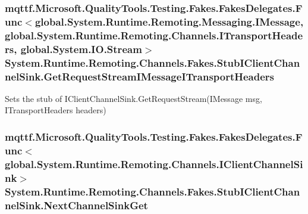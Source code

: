 \hypertarget{class_system_1_1_runtime_1_1_remoting_1_1_channels_1_1_fakes_1_1_stub_i_client_channel_sink_a3360fc1881ec5d814a861955162276dd}{
\subsubsection[{Get\-Request\-Stream\-I\-Message\-I\-Transport\-Headers}]{\setlength{\rightskip}{0pt plus 5cm}mqttf.\-Microsoft.\-Quality\-Tools.\-Testing.\-Fakes.\-Fakes\-Delegates.\-Func$<$global.\-System.\-Runtime.\-Remoting.\-Messaging.\-I\-Message, global.\-System.\-Runtime.\-Remoting.\-Channels.\-I\-Transport\-Headers, global.\-System.\-I\-O.\-Stream$>$ System.\-Runtime.\-Remoting.\-Channels.\-Fakes.\-Stub\-I\-Client\-Channel\-Sink.\-Get\-Request\-Stream\-I\-Message\-I\-Transport\-Headers}}\label{class_system_1_1_runtime_1_1_remoting_1_1_channels_1_1_fakes_1_1_stub_i_client_channel_sink_a3360fc1881ec5d814a861955162276dd}


Sets the stub of I\-Client\-Channel\-Sink.\-Get\-Request\-Stream(\-I\-Message msg, I\-Transport\-Headers headers)

\hypertarget{class_system_1_1_runtime_1_1_remoting_1_1_channels_1_1_fakes_1_1_stub_i_client_channel_sink_ad646ec92d08ea2c93afee3162f965652}{
\subsubsection[{Next\-Channel\-Sink\-Get}]{\setlength{\rightskip}{0pt plus 5cm}mqttf.\-Microsoft.\-Quality\-Tools.\-Testing.\-Fakes.\-Fakes\-Delegates.\-Func$<$global.\-System.\-Runtime.\-Remoting.\-Channels.\-I\-Client\-Channel\-Sink$>$ System.\-Runtime.\-Remoting.\-Channels.\-Fakes.\-Stub\-I\-Client\-Channel\-Sink.\-Next\-Channel\-Sink\-Get}}\label{class_system_1_1_runtime_1_1_remoting_1_1_channels_1_1_fakes_1_1_stub_i_client_channel_sink_ad646ec92d08ea2c93afee3162f965652}


